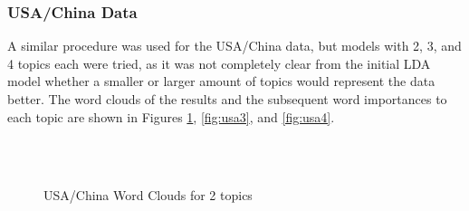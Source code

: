 \subsubsection{USA/China Data}
A similar procedure was used for the USA/China data, but models with 2, 3, and 4 topics each were tried, as it was not completely clear from the initial LDA model whether a smaller or larger amount of topics would represent the data better. The word clouds of the results and the subsequent word importances to each topic are shown in Figures \ref{fig:usa2}, \ref{fig:usa3}, and \ref{fig:usa4}. 
\begin{figure}[H]
	\centering
	\\
	\\
	
	\caption{USA/China Word Clouds for 2 topics}
	\label{fig:usa2}
\end{figure}

